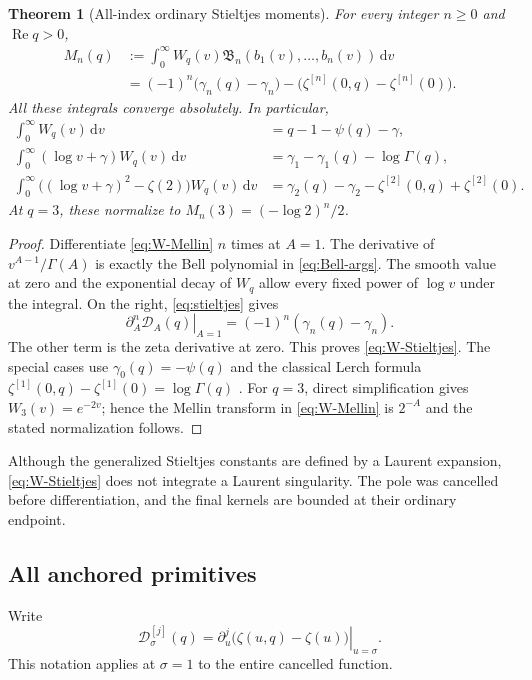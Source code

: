 \documentclass[11pt]{article}
\numberwithin{equation}{section}
\newtheorem{theorem}{Theorem}[section]
\theoremstyle{definition}
\DeclareMathOperator{\Rea}{Re}
\newcommand{\dd}{\,\mathrm d}
\newcommand{\DD}{\mathcal D}
\begin{document}
\begin{theorem}[All-index ordinary Stieltjes moments]\label{thm:W-Stieltjes}
For every integer $n\ge0$ and $\Rea q>0$,
\begin{equation}\label{eq:W-Stieltjes}
 \begin{split}
 M_n(q)&:=\int_0^\infty W_q(v)\mathfrak B_n(b_1(v),\ldots,b_n(v))\dd v\\
 &=(-1)^n\bigl(\gamma_n(q)-\gamma_n\bigr)
   -\bigl(\zeta^{[n]}(0,q)-\zeta^{[n]}(0)\bigr).
 \end{split}
\end{equation}
All these integrals converge absolutely. In particular,
\begin{align}
 \int_0^\infty W_q(v)\dd v
 &=q-1-\psi(q)-\gamma,\label{eq:W0}\\
 \int_0^\infty(\log v+\gamma)W_q(v)\dd v
 &=\gamma_1-\gamma_1(q)-\log\Gamma(q),\label{eq:W1}\\
 \int_0^\infty\bigl((\log v+\gamma)^2-\zeta(2)\bigr)W_q(v)\dd v
 &=\gamma_2(q)-\gamma_2-\zeta^{[2]}(0,q)+\zeta^{[2]}(0).
 \label{eq:W2}
\end{align}
At $q=3$, these normalize to $M_n(3)=(-\log2)^n/2$.
\end{theorem}
\begin{proof}
Differentiate \eqref{eq:W-Mellin} $n$ times at $A=1$. The derivative of $v^{A-1}/\Gamma(A)$ is exactly the Bell polynomial in \eqref{eq:Bell-args}. The smooth value at zero and the exponential decay of $W_q$ allow every fixed power of $\log v$ under the integral. On the right, \eqref{eq:stieltjes} gives
\[
 \left.\partial_A^n\DD_A(q)\right|_{A=1}
 =(-1)^n(\gamma_n(q)-\gamma_n).
\]
The other term is the zeta derivative at zero. This proves \eqref{eq:W-Stieltjes}. The special cases use $\gamma_0(q)=-\psi(q)$ and the classical Lerch formula
$\zeta^{[1]}(0,q)-\zeta^{[1]}(0)=\log\Gamma(q)$ \cite{DLMFzeta}.
For $q=3$, direct simplification gives $W_3(v)=e^{-2v}$; hence the Mellin transform in \eqref{eq:W-Mellin} is $2^{-A}$ and the stated normalization follows.
\end{proof}

Although the generalized Stieltjes constants are defined by a Laurent expansion, \eqref{eq:W-Stieltjes} does not integrate a Laurent singularity. The pole was cancelled before differentiation, and the final kernels are bounded at their ordinary endpoint.

\subsection{All anchored primitives}
Write
\[
 \DD_\sigma^{[j]}(q)=
 \left.\partial_u^j\bigl(\zeta(u,q)-\zeta(u)\bigr)\right|_{u=\sigma}.
\]
This notation applies at $\sigma=1$ to the entire cancelled function.
\end{document}
